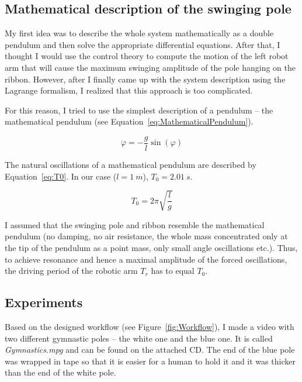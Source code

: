         \subsection{Mathematical description of the swinging pole}

            My first idea was to describe the whole system mathematically as a double pendulum and then solve the appropriate differential equations. After that, I thought I would use the control theory to compute the motion of the left robot arm that will cause the maximum swinging amplitude of the pole hanging on the ribbon. However, after I finally came up with the system description using the Lagrange formalism, I realized that this approach is too complicated.

            For this reason, I tried to use the simplest description of a pendulum -- the mathematical pendulum (see Equation~\eqref{eq:MathematicalPendulum}).

            \begin{equation} \label{eq:MathematicalPendulum}
                \ddot{\varphi} = -\frac{g}{l}\sin(\varphi)
            \end{equation}

            The natural oscillations of a mathematical pendulum are described by Equation~\eqref{eq:T0}. In our case ($l = \SI{1}{m}$), $T_0 = \SI{2.01}{s}$.

            \begin{equation} \label{eq:T0}
                T_0 = 2 \pi \sqrt{\frac{l}{g}}
            \end{equation}

            I assumed that the swinging pole and ribbon resemble the mathematical pendulum (no damping, no air resistance, the whole mass concentrated only at the tip of the pendulum as a point mass, only small angle oscillations etc.). Thus, to achieve resonance and hence a maximal amplitude of the forced oscillations, the driving period of the robotic arm $T_r$ has to equal $T_0$.


        \subsection{Experiments}
            Based on the designed workflow (see Figure~\ref{fig:Workflow}), I made a video with two different gymnastic poles -- the white one and the blue one. It is called \textit{Gymnastics.mpg} and can be found on the attached CD. The end of the blue pole was wrapped in tape so that it is easier for a human to hold it and it was thicker than the end of the white pole.

